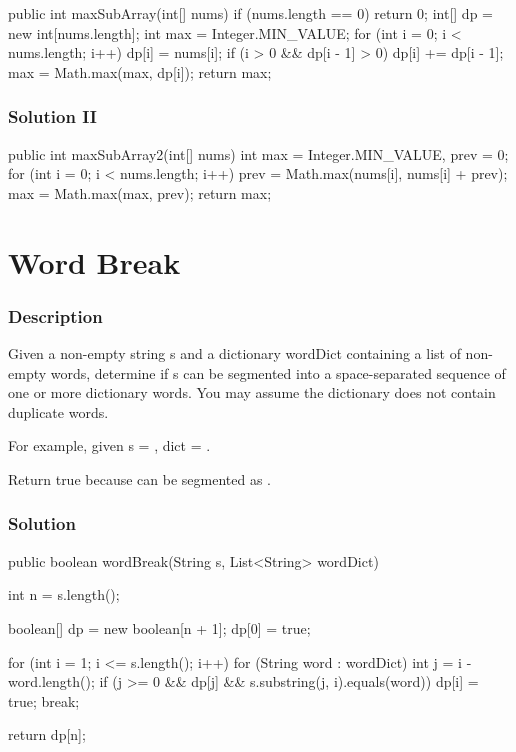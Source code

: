 \begin{Code}
public int maxSubArray(int[] nums) {
    if (nums.length == 0) {
        return 0;
    }
    int[] dp = new int[nums.length];
    int max = Integer.MIN_VALUE;
    for (int i = 0; i < nums.length; i++) {
        dp[i] = nums[i];
        if (i > 0 && dp[i - 1] > 0) {
            dp[i] += dp[i - 1];
        }
        max = Math.max(max, dp[i]);
    }
    return max;
}
\end{Code}

\subsubsection{Solution II}
\begin{Code}
public int maxSubArray2(int[] nums) {
    int max = Integer.MIN_VALUE, prev = 0;
    for (int i = 0; i < nums.length; i++) {
        prev = Math.max(nums[i], nums[i] + prev);
        max = Math.max(max, prev);
    }
    return max;
}
\end{Code}

\newpage

\section{Word Break} %

\subsubsection{Description}
Given a non-empty string s and a dictionary wordDict containing a list of non-empty words, determine if s can be segmented into a space-separated sequence of one or more dictionary words. You may assume the dictionary does not contain duplicate words.

For example, given
s = ,
dict = .

Return true because  can be segmented as .

\subsubsection{Solution}

\begin{Code}
public boolean wordBreak(String s, List<String> wordDict) {
    int n = s.length();

    boolean[] dp = new boolean[n + 1];
    dp[0] = true;

    for (int i = 1; i <= s.length(); i++) {
        for (String word : wordDict) {
            int j = i - word.length();
            if (j >= 0 && dp[j] && s.substring(j, i).equals(word)) {
                dp[i] = true;
                break;
            }
        }
    }

    return dp[n];
}
\end{Code}

